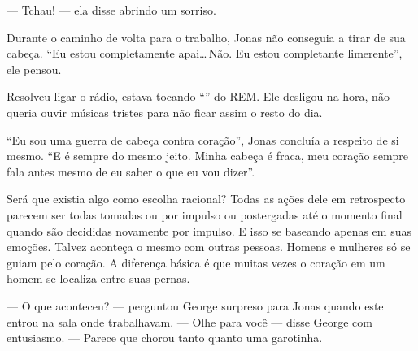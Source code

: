 --- Tchau! --- ela disse\mudanca{,} abrindo um sorriso.

\begin{sloppypar}
Durante o caminho de volta para o trabalho, Jonas não conseguia a tirar de sua cabeça. ``Eu estou completamente apai\ldots\,Não. Eu estou completante limerente'', ele pensou.
\end{sloppypar}

Resolveu ligar o rádio, estava tocando ``'' do REM. Ele desligou na hora, não queria ouvir músicas tristes para não ficar assim o resto do dia.

``Eu sou uma guerra de cabeça contra coração'', Jonas concluía a respeito de si mesmo. ``E é sempre do mesmo jeito. Minha cabeça é fraca, meu coração sempre fala antes mesmo de eu saber o que eu vou dizer''.

Será que existia algo como escolha racional? Todas as ações dele\mudanca{,} em retrospecto\mudanca{,} parecem ser todas tomadas ou por impulso ou postergadas até o momento final\mudanca{,} quando são decididas novamente por impulso. E isso se baseando apenas em suas emoções. Talvez aconteça o mesmo com outras pessoas. Homens e mulheres só se guiam pelo coração. A diferença básica é que muitas vezes o coração em um homem se localiza entre suas pernas.

--- O que aconteceu? --- perguntou George surpreso para Jonas quando este entrou na sala onde trabalhavam. --- Olhe para você --- disse George com entusiasmo. --- Parece que chorou tanto quanto uma garotinha.
